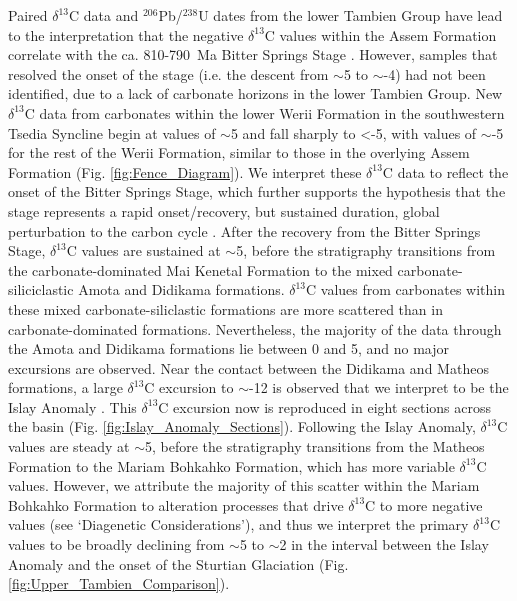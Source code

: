 \documentclass[11pt,letterpaper]{article}
\newcommand{\dC}{$\delta^{13}$C\xspace}
\newcommand{\permil}{\textperthousand\xspace}
\newcommand{\UPb}{$^{206}$Pb/$^{238}$U\xspace}
\begin{document}
Paired \dC data and \UPb dates from the lower Tambien Group have lead to the interpretation that the negative \dC values within the Assem Formation correlate with the ca. 810-790~Ma Bitter Springs Stage \citep{Swanson-Hysell2015a}. However, samples that resolved the onset of the stage (i.e. the descent from $\sim$5\permil to $\sim$-4\permil) had not been identified, due to a lack of carbonate horizons in the lower Tambien Group. New \dC data from carbonates within the lower Werii Formation in the southwestern Tsedia Syncline begin at values of $\sim$5\permil and fall sharply to \textless-5\permil, with values of $\sim$-5\permil for the rest of the Werii Formation, similar to those in the overlying Assem Formation (Fig. \ref{fig:Fence_Diagram}). We interpret these \dC data to reflect the onset of the Bitter Springs Stage, which further supports the hypothesis that the stage represents a rapid onset/recovery, but sustained duration, global perturbation to the carbon cycle \citep{Maloof2006a, Swanson-Hysell2015a}. After the recovery from the Bitter Springs Stage, \dC values are sustained at $\sim$5\permil, before the stratigraphy transitions from the carbonate-dominated Mai Kenetal Formation to the mixed carbonate-siliciclastic Amota and Didikama formations. \dC values from carbonates within these mixed carbonate-siliclastic formations are more scattered than in carbonate-dominated formations. Nevertheless, the majority of the data through the Amota and Didikama formations lie between 0 and 5\permil, and no major excursions are observed. Near the contact between the Didikama and Matheos formations, a large \dC excursion to $\sim$-12\permil is observed that we interpret to be the Islay Anomaly \citep{Swanson-Hysell2015a, MacLennan2018a}. This \dC excursion now is reproduced in eight sections across the basin (Fig. \ref{fig:Islay_Anomaly_Sections}). Following the Islay Anomaly, \dC values are steady at $\sim$5\permil, before the stratigraphy transitions from the Matheos Formation to the Mariam Bohkahko Formation, which has more variable \dC values. However, we attribute the majority of this scatter within the Mariam Bohkahko Formation to alteration processes that drive \dC to more negative values (see `Diagenetic Considerations'), and thus we interpret the primary \dC values to be broadly declining from $\sim$5\permil to $\sim$2\permil in the interval between the Islay Anomaly and the onset of the Sturtian Glaciation (Fig. \ref{fig:Upper_Tambien_Comparison}).
\end{document}
